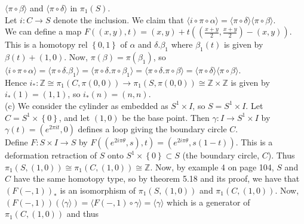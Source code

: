 \documentclass[a4paper]{article}
\begin{document}
    $\langle \pi \circ \beta \rangle $ and $\langle \pi \circ \delta \rangle
    $ in
    $\pi_1 (S)$.\\
    Let $i  \colon C \to S$ denote the inclusion. We claim that
    $\langle i \circ \pi \circ \alpha \rangle 
    = \langle \pi \circ \delta \rangle \langle \pi \circ \beta \rangle $.\\
   We can define a map
   $F((x,y),t) = (x,y) + t \left( 
   \left( \frac{x+y}{2}, \frac{x+y}{2} \right) - (x,y)\right) $. This is a
   homotopy rel $\left\{ 0,1 \right\} $ of
   $\alpha$ and $\delta . \beta_1$ where
   $\beta_1(t)$ is given by $\beta (t) + (1,0)$. Now, $
   \pi \left( \beta \right) 
   = \pi \left( \beta_1 \right) $, so 
   $\langle i \circ \pi \circ \alpha \rangle 
   = \langle \pi \circ \delta. \beta_1 \rangle 
   = \langle \pi \circ \delta . \pi \circ \beta_1 \rangle 
   = \langle \pi \circ \delta . \pi \circ \beta \rangle 
   = \langle \pi \circ \delta \rangle 
   \langle \pi \circ \beta \rangle $.\\
   \linebreak
   Hence $i_*  \colon \mathbb{Z} \cong 
   \pi_1 \left( C, \pi(0,0) \right) 
   \to  \pi_1 \left( S, \pi(0,0) \right) 
   \cong \mathbb{Z} \times \mathbb{Z}$ is given by
   $i_*(1) = (1,1)$, so
   $i_*(n) = (n,n)$.\\
   \linebreak
   (c) We consider the cylinder as embedded as
   $S^{1} \times I$, so $S = S^{1} \times I$. Let
   $C = S^{1} \times  \left\{ 0 \right\} $, and let 
   $(1,0)$ be the base point. Then $\gamma  \colon
   I \to S^{1} \times I$ by
   $\gamma (t) = \left( e^{2 \pi i t},0 \right) $ defines a loop
   giving the boundary circle $C$.\\
   \linebreak
   Define $F  \colon S \times I \to S$ by
   $F\left( \left( e^{2 i \pi \theta},s \right) , t \right) 
   = \left( e^{2 i \pi \theta}, s (1-t) \right) $. This is a deformation
   retraction of $S$ onto $S^{1} \times \left\{ 0 \right\} \subset S$ (the
   boundary circle, $C$). Thus
   $\pi_1 (S, (1,0)) \cong \pi_1 (C, (1,0)) \cong \mathbb{Z}$. Now, by example
   4 on page 104, $S$ and $C$ have the same homotopy type, so
   by theorem 5.18 and its proof, we have that
   $\left( F(-,1) \right)_*$ is an isomorphism of
   $\pi_1 (S, (1,0))$ and $\pi_1 (C,(1,0))$. Now,
   $\left( F(-,1) \right)
   \left( \langle \gamma \rangle  \right) 
   = \langle F(-,1) \circ \gamma  \rangle 
   = \langle \gamma \rangle $ which is a generator of
   $\pi_1 \left( C, (1,0) \right) $ and thus
\end{document}
